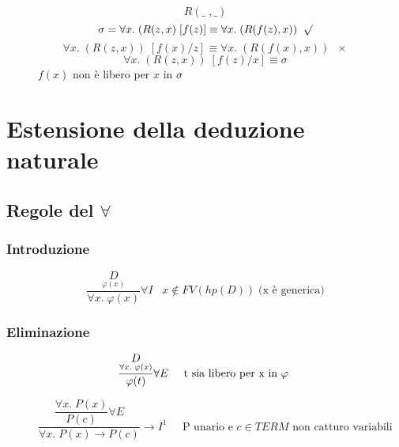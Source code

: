 \documentclass{article}
\theoremstyle{break}
\theoremstyle{break}
\theoremstyle{break}
\theoremstyle{break}
\begin{document}
\begin{figure}[H]
  \begin{example}
    \[
    R(\_\;,\_)
    \] 
    \[
      \sigma=\forall x.\;(R(z,x)\;[f(z)] \equiv \forall x.\; (R(f(z),x)) \;\;\surd
    \] 
    \[
      \forall x.\; (R(z,x))\;[f(x)/z] \equiv \forall x.\; (R(f(x),x)) \;\;\times
    \] 
    \[
      \forall x.\; (R(z,x))\;[f(z)/x] \equiv \sigma
    \] 
    \( f(x) \) non è libero per \( x \) in \( \sigma \)
  \end{example}
\end{figure}

\section{Estensione della deduzione naturale}
\subsection{Regole del \( \forall  \)}
\subsubsection{Introduzione}
    \large\[
      \frac{\underset{\varphi(x)}{D}}{\forall x.\; \varphi(x)}\forall I \;\;\; x \notin FV(hp(D))\; \text{(x è generica)}
    \]
\subsubsection{Eliminazione}
  \large\[
    \frac{\underset{\forall x.\; \varphi(x)}{D}}{\varphi(t)} \forall E \;\;\;\;\; \text{t sia libero per x in \( \varphi \) }
  \] 
  \begin{figure}[H]
    \begin{exercise}
      \[
        \dfrac{\dfrac{\forall x.\; P(x)}{P(c)}\forall E}{\forall x.\; P(x) \to P(c)} \to I^1 \;\;\;\;\; \text{P unario e \(c \in TERM \) non catturo variabili }
      \] 
    \end{exercise}
  \end{figure}
\end{document}
